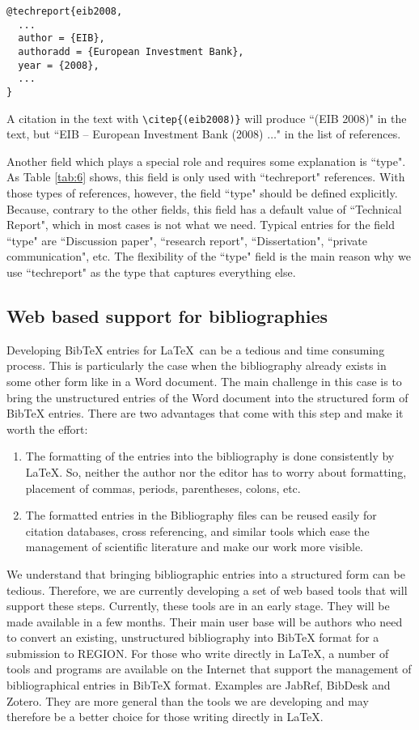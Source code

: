 \documentclass[a4paper,twoside]{article}
\begin{document}
\begin{verbatim}
@techreport{eib2008,
  ...
  author = {EIB},
  authoradd = {European Investment Bank},
  year = {2008},
  ...
}
\end{verbatim}

A citation in the text with \verb|\citep{(eib2008)}| will produce ``(EIB 2008)" in the text, but ``EIB -- European Investment Bank (2008) $\ldots$" in the list of references.

Another field which plays a special role and requires some explanation is ``type". As Table \ref{tab:6} shows, this field is only used with ``techreport" references. With those types of references, however, the field ``type" should be defined explicitly. Because, contrary to the other fields, this field has a default value of ``Technical Report", which in most cases is not what we need. Typical entries for the field ``type" are ``Discussion paper", ``research report", ``Dissertation", ``private communication", etc. The flexibility of the ``type" field is the main reason why we use ``techreport" as the type that captures everything else.


\subsection{Web based support for bibliographies}
\label{sec:5.4}

Developing BibTeX entries for \LaTeX\ can be a tedious and time consuming process. This is particularly the case when the bibliography already exists in some other form like in a Word document. The main challenge in this case is to bring the unstructured entries of the Word document into the structured form of BibTeX entries. There are two advantages that come with this step and make it worth the effort:
\begin{enumerate}
  \item The formatting of the entries into the bibliography is done consistently by \LaTeX. So, neither the author nor the editor has to worry about formatting, placement of commas, periods, parentheses, colons, etc. 
  \item The formatted entries in the Bibliography files can be reused easily for citation databases, cross referencing, and similar tools which ease the management of scientific literature and make our work more visible. 
\end{enumerate}

We understand that bringing bibliographic entries into a structured form can be tedious. Therefore, we are currently developing a set of web based tools that will support these steps. Currently, these tools are in an early stage. They will be made available in a few months. Their main user base will be authors who need to convert an existing, unstructured bibliography into BibTeX format for a submission to REGION. For those who write directly in \LaTeX, a number of tools and programs are available on the Internet that support the management of bibliographical entries in BibTeX format. Examples are JabRef, BibDesk and Zotero. They are more general than the tools we are developing and may therefore be a better choice for those writing directly in \LaTeX.
\end{document}
